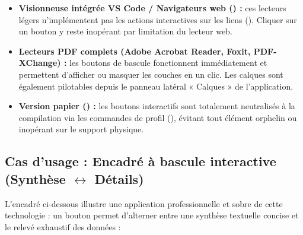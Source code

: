 \begin{itemize}
  \item \textbf{Visionneuse intégrée VS Code / Navigateurs web () :}
  ces lecteurs légers n'implémentent pas les actions interactives sur les liens ().
  Cliquer sur un bouton y reste inopérant par limitation du lecteur web.
  \item \textbf{Lecteurs PDF complets (Adobe Acrobat Reader, Foxit, PDF-XChange) :}
  les boutons de bascule fonctionnent immédiatement et permettent d'afficher ou masquer les couches en un clic.
  Les calques sont également pilotables depuis le panneau latéral « Calques » de l'application.
  \item \textbf{Version papier (\code{[print]}) :}
  les boutons interactifs sont totalement neutralisés à la compilation
  via les commandes de profil (),
  évitant tout élément orphelin ou inopérant sur le support physique.
\end{itemize}

\subsection[Cas d'usage : Encadré à bascule interactive]{Cas d'usage : Encadré à bascule interactive (Synthèse \texorpdfstring{$\longleftrightarrow$}{vs} Détails)}
L'encadré ci-dessous illustre une application professionnelle et sobre de cette technologie :
un bouton permet d'alterner entre une synthèse textuelle concise et le relevé exhaustif des données :

